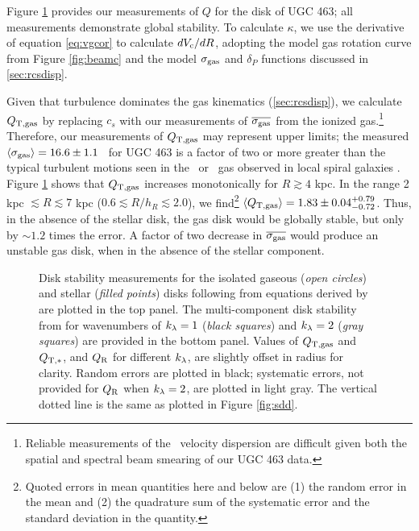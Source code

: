 \documentclass[apj,iop,numberedappendix]{emulateapj}
\begin{document}
Figure \ref{fig:q} provides our measurements of $Q$ for the disk of UGC 463; all
measurements demonstrate global stability.  To calculate $\kappa$, we use the
derivative of equation \ref{eq:vgcor} to calculate $dV_{\rm c}/dR$, adopting the model
gas rotation curve from Figure \ref{fig:beamc} and the model $\sigma_{\rm gas}$ and
$\delta_P$ functions discussed in \sect \ref{sec:rcsdisp}.

Given that turbulence dominates the gas kinematics (\sect \ref{sec:rcsdisp}), we
calculate $Q_{\rm T,gas}$ by replacing $c_s$ with our measurements of $\overline{\sigma_{\rm gas}}$
from the ionized gas.\footnote{
%
Reliable measurements of the \hone\ velocity dispersion are difficult given both
the spatial and spectral beam smearing of our UGC 463 data.
%
}  Therefore, our measurements of $Q_{\rm T,gas}$ may represent upper limits; the
measured $\langle \sigma_{\rm gas} \rangle = 16.6\pm1.1$ \kms\ for UGC 463 is a factor of two or
more greater than the typical turbulent motions seen in the \hone\ or \molh\ gas
observed in local spiral galaxies \citep{2009A&A...495..795H,
2009AJ....137.4424T}.  Figure \ref{fig:q} shows that $Q_{\rm T,gas}$ increases
monotonically for $R\gtrsim4$ kpc.  In the range 2 kpc $\lesssim R\lesssim 7$
kpc ($0.6\lesssim R/h_R\lesssim 2.0$), we find\footnote{
%
Quoted errors in mean quantities here and below are (1) the random error in the
mean and (2) the quadrature sum of the systematic error and the standard
deviation in the quantity.
%
} $\langle Q_{\rm T,gas} \rangle = 1.83\pm0.04^{+0.79}_{-0.72}$.  Thus, in the absence of the
stellar disk, the gas disk would be globally stable, but only by $\sim1.2$ times
the error.  A factor of two decrease in $\overline{\sigma_{\rm gas}}$ would produce an
unstable gas disk, when in the absence of the stellar component.

\begin{figure}
\caption{
%
Disk stability measurements for the isolated gaseous ({\it open circles}) and
stellar ({\it filled points}) disks following from equations derived by
\citet[][$Q_{\rm T}$, {\it top}]{1964ApJ...139.1217T} are plotted in the top
panel.  The multi-component disk stability from \citet[$Q_{\rm R}$, {\it
bottom}]{2001MNRAS.323..445R} for wavenumbers of $k_{\lambda} = 1$ ({\it black squares})
and $k_{\lambda} = 2$ ({\it gray squares}) are provided in the bottom panel.  Values of
$Q_{\rm T,gas}$ and $Q_{{\rm T,}\ast}$, and $Q_{\rm R}$ for different $k_{\lambda}$, are slightly offset in radius
for clarity.  Random errors are plotted in black; systematic errors, not
provided for $Q_{\rm R}$ when $k_{\lambda}=2$, are plotted in light gray.  The vertical dotted
line is the same as plotted in Figure \ref{fig:sdd}.
%
}
\label{fig:q}
\end{figure}
\end{document}
